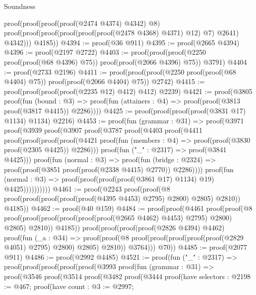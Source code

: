 \begin{lexlean}{Soundness}
\begin{coremodule}
            proof(proof(proof(proof(@2474 @4374) @4342) @8)
                proof(proof(proof(proof(proof(proof(@2478 @4368) @4371) @12) @7) @2641) @4342)))
          @4185))
@4394 := proof(@36 @911)
@4395 := proof(@2665 @4394)
@4396 := proof(@2197 @2722)
@4403 := proof(proof(proof(@2250 proof(proof(@68 @4396) @75)) proof(proof(@2066 @4396) @75)) @3791)
@4404 := proof(@2733 @2196)
@4411 := proof(proof(proof(@2250 proof(proof(@68 @4404) @75)) proof(proof(@2066 @4404) @75)) @2742)
@4415 := proof(proof(proof(proof(@2235 @12) @412) @412) @2239)
@4421 := proof(@3805
      proof(fun (bound : @3) =>
        proof(fun (attainers : @4) => proof(proof(@3813 proof(@3817 @4415)) @2286))))
@4425 := proof(proof(proof(proof(@3831 @17) @1134) @1134) @2216)
@4453 := proof(fun (grammar : @31) =>
    proof(@3971
        proof(@3939
            proof(@3907
                proof(@3787
                    proof(@4403
                        proof(@4411
                            proof(proof(proof(proof(@4421
                                      proof(fun (members : @4) =>
                                        proof(proof(@3830 proof(@2305 @4425)) @2286)))
                                    proof(fun ("_" : @2317) => proof(@3841 @4425)))
                                  proof(fun (normal : @3) =>
                                    proof(fun (bridge : @2324) =>
                                      proof(proof(@3851 proof(proof(@2338 @4415) @2770)) @2286))))
                                proof(fun (normal : @3) =>
                                  proof(proof(proof(proof(@3861 @17) @1134) @19) @4425))))))))))
@4461 := proof(@2243
      proof(proof(@8 proof(proof(proof(proof(proof(@4395 @4453) @2795) @2800) @2805) @2810)) @4185))
@4462 := proof(@40 @159)
@4484 := proof(proof(@4461
        proof(proof(@8
              proof(proof(proof(proof(proof(proof(@2665 @4462) @4453) @2795) @2800) @2805) @2810))
            @4185))
      proof(proof(proof(proof(@2826 @4394) @4462)
            proof(fun (_a : @34) =>
              proof(proof(@8 proof(proof(proof(proof(proof(@2829 @4051) @2795) @2800) @2805) @2810))
                  @3764)))
          @70))
@4485 := proof(@2077 @911)
@4486 := proof(@2992 @4485)
@4521 := proof(fun ("_" : @2317) =>
    proof(proof(proof(proof(proof(@3993
                proof(fun (grammar : @31) =>
                  proof(@3546
                      proof(@3514
                          proof(@3482
                              proof(@3444
                                  proof(have selectors : @2198 := @467;
                                    proof(have count : @3 := @2997;

\end{coremodule}
\end{lexlean}
